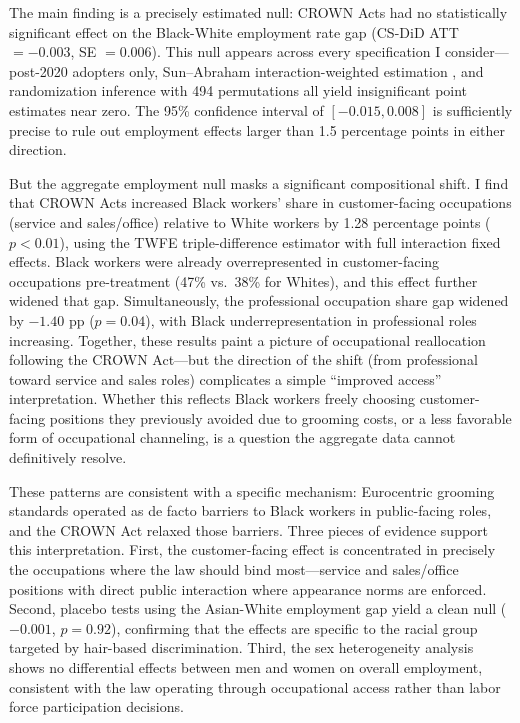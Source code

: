 \documentclass[12pt]{article}
\begin{document}
The main finding is a precisely estimated null: CROWN Acts had no statistically significant effect on the Black-White employment rate gap (CS-DiD ATT $= -0.003$, SE $= 0.006$). This null appears across every specification I consider---post-2020 adopters only, Sun--Abraham interaction-weighted estimation \citep{sunAbraham2021}, and randomization inference with 494 permutations all yield insignificant point estimates near zero. The 95\% confidence interval of $[-0.015, 0.008]$ is sufficiently precise to rule out employment effects larger than 1.5 percentage points in either direction.

But the aggregate employment null masks a significant compositional shift. I find that CROWN Acts increased Black workers' share in customer-facing occupations (service and sales/office) relative to White workers by 1.28 percentage points ($p < 0.01$), using the TWFE triple-difference estimator with full interaction fixed effects. Black workers were already overrepresented in customer-facing occupations pre-treatment (47\% vs.\ 38\% for Whites), and this effect further widened that gap. Simultaneously, the professional occupation share gap widened by $-1.40$ pp ($p = 0.04$), with Black underrepresentation in professional roles increasing. Together, these results paint a picture of occupational reallocation following the CROWN Act---but the direction of the shift (from professional toward service and sales roles) complicates a simple ``improved access'' interpretation. Whether this reflects Black workers freely choosing customer-facing positions they previously avoided due to grooming costs, or a less favorable form of occupational channeling, is a question the aggregate data cannot definitively resolve.

These patterns are consistent with a specific mechanism: Eurocentric grooming standards operated as de facto barriers to Black workers in public-facing roles, and the CROWN Act relaxed those barriers. Three pieces of evidence support this interpretation. First, the customer-facing effect is concentrated in precisely the occupations where the law should bind most---service and sales/office positions with direct public interaction where appearance norms are enforced. Second, placebo tests using the Asian-White employment gap yield a clean null ($-0.001$, $p = 0.92$), confirming that the effects are specific to the racial group targeted by hair-based discrimination. Third, the sex heterogeneity analysis shows no differential effects between men and women on overall employment, consistent with the law operating through occupational access rather than labor force participation decisions.
\end{document}

